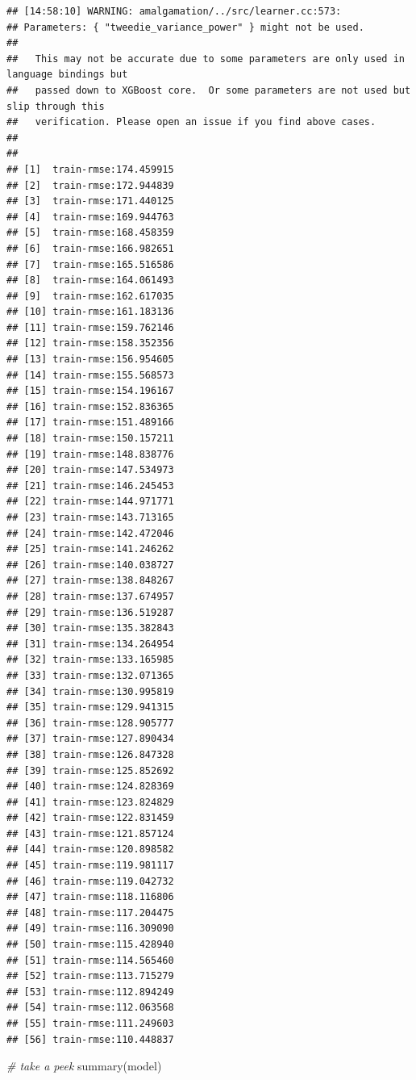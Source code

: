 \documentclass[
]{article}
\newenvironment{Shaded}{\begin{snugshade}}{\end{snugshade}}
\newcommand{\CommentTok}[1]{\textcolor[rgb]{0.56,0.35,0.01}{\textit{#1}}}
\newcommand{\FunctionTok}[1]{\textcolor[rgb]{0.00,0.00,0.00}{#1}}
\newcommand{\NormalTok}[1]{#1}
\begin{document}
\begin{verbatim}
## [14:58:10] WARNING: amalgamation/../src/learner.cc:573: 
## Parameters: { "tweedie_variance_power" } might not be used.
## 
##   This may not be accurate due to some parameters are only used in language bindings but
##   passed down to XGBoost core.  Or some parameters are not used but slip through this
##   verification. Please open an issue if you find above cases.
## 
## 
## [1]  train-rmse:174.459915 
## [2]  train-rmse:172.944839 
## [3]  train-rmse:171.440125 
## [4]  train-rmse:169.944763 
## [5]  train-rmse:168.458359 
## [6]  train-rmse:166.982651 
## [7]  train-rmse:165.516586 
## [8]  train-rmse:164.061493 
## [9]  train-rmse:162.617035 
## [10] train-rmse:161.183136 
## [11] train-rmse:159.762146 
## [12] train-rmse:158.352356 
## [13] train-rmse:156.954605 
## [14] train-rmse:155.568573 
## [15] train-rmse:154.196167 
## [16] train-rmse:152.836365 
## [17] train-rmse:151.489166 
## [18] train-rmse:150.157211 
## [19] train-rmse:148.838776 
## [20] train-rmse:147.534973 
## [21] train-rmse:146.245453 
## [22] train-rmse:144.971771 
## [23] train-rmse:143.713165 
## [24] train-rmse:142.472046 
## [25] train-rmse:141.246262 
## [26] train-rmse:140.038727 
## [27] train-rmse:138.848267 
## [28] train-rmse:137.674957 
## [29] train-rmse:136.519287 
## [30] train-rmse:135.382843 
## [31] train-rmse:134.264954 
## [32] train-rmse:133.165985 
## [33] train-rmse:132.071365 
## [34] train-rmse:130.995819 
## [35] train-rmse:129.941315 
## [36] train-rmse:128.905777 
## [37] train-rmse:127.890434 
## [38] train-rmse:126.847328 
## [39] train-rmse:125.852692 
## [40] train-rmse:124.828369 
## [41] train-rmse:123.824829 
## [42] train-rmse:122.831459 
## [43] train-rmse:121.857124 
## [44] train-rmse:120.898582 
## [45] train-rmse:119.981117 
## [46] train-rmse:119.042732 
## [47] train-rmse:118.116806 
## [48] train-rmse:117.204475 
## [49] train-rmse:116.309090 
## [50] train-rmse:115.428940 
## [51] train-rmse:114.565460 
## [52] train-rmse:113.715279 
## [53] train-rmse:112.894249 
## [54] train-rmse:112.063568 
## [55] train-rmse:111.249603 
## [56] train-rmse:110.448837
\end{verbatim}

\begin{Shaded}
\begin{Highlighting}[]
\CommentTok{\# take a peek}
\FunctionTok{summary}\NormalTok{(model)}
\end{Highlighting}
\end{Shaded}
\end{document}
